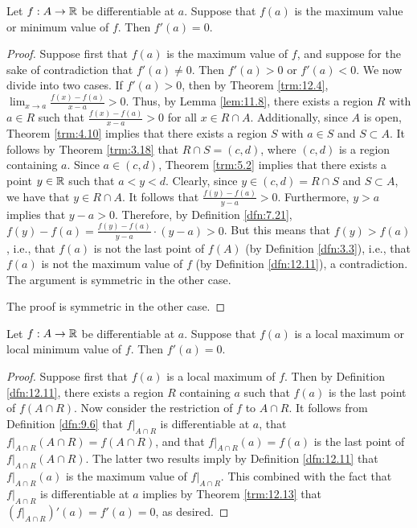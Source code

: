 \documentclass[../main.tex]{subfiles}
\begin{document}
\begin{theorem}\label{trm:12.13}
    Let $f:A\to\mathbb{R}$ be differentiable at $a$. Suppose that $f(a)$ is the maximum value or minimum value of $f$. Then $f'(a)=0$.
    \begin{proof}
        Suppose first that $f(a)$ is the maximum value of $f$, and suppose for the sake of contradiction that $f'(a)\neq 0$. Then $f'(a)>0$ or $f'(a)<0$. We now divide into two cases. If $f'(a)>0$, then by Theorem \ref{trm:12.4}, $\lim_{x\to a}\frac{f(x)-f(a)}{x-a}>0$. Thus, by Lemma \ref{lem:11.8}, there exists a region $R$ with $a\in R$ such that $\frac{f(x)-f(a)}{x-a}>0$ for all $x\in R\cap A$. Additionally, since $A$ is open, Theorem \ref{trm:4.10} implies that there exists a region $S$ with $a\in S$ and $S\subset A$. It follows by Theorem \ref{trm:3.18} that $R\cap S=(c,d)$, where $(c,d)$ is a region containing $a$. Since $a\in(c,d)$, Theorem \ref{trm:5.2} implies that there exists a point $y\in\mathbb{R}$ such that $a<y<d$. Clearly, since $y\in(c,d)=R\cap S$ and $S\subset A$, we have that $y\in R\cap A$. It follows that $\frac{f(y)-f(a)}{y-a}>0$. Furthermore, $y>a$ implies that $y-a>0$. Therefore, by Definition \ref{dfn:7.21}, $f(y)-f(a)=\frac{f(y)-f(a)}{y-a}\cdot(y-a)>0$. But this means that $f(y)>f(a)$, i.e., that $f(a)$ is not the last point of $f(A)$ (by Definition \ref{dfn:3.3}), i.e., that $f(a)$ is not the maximum value of $f$ (by Definition \ref{dfn:12.11}), a contradiction. The argument is symmetric in the other case.\par
        The proof is symmetric in the other case.
    \end{proof}
\end{theorem}

\begin{corollary}\label{cly:12.14}
    Let $f:A\to\mathbb{R}$ be differentiable at $a$. Suppose that $f(a)$ is a local maximum or local minimum value of $f$. Then $f'(a)=0$.
    \begin{proof}
        Suppose first that $f(a)$ is a local maximum of $f$. Then by Definition \ref{dfn:12.11}, there exists a region $R$ containing $a$ such that $f(a)$ is the last point of $f(A\cap R)$. Now consider the restriction of $f$ to $A\cap R$. It follows from Definition \ref{dfn:9.6} that $f|_{A\cap R}$ is differentiable at $a$, that $f|_{A\cap R}(A\cap R)=f(A\cap R)$, and that $f|_{A\cap R}(a)=f(a)$ is the last point of $f|_{A\cap R}(A\cap R)$. The latter two results imply by Definition \ref{dfn:12.11} that $f|_{A\cap R}(a)$ is the maximum value of $f|_{A\cap R}$. This combined with the fact that $f|_{A\cap R}$ is differentiable at $a$ implies by Theorem \ref{trm:12.13} that $(f|_{A\cap R})'(a)=f'(a)=0$, as desired.
    \end{proof}
\end{corollary}
\end{document}
